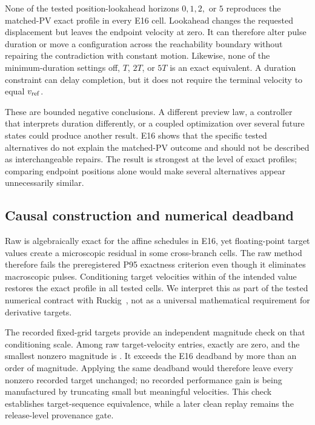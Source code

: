 None of the tested position-lookahead horizons $0,1,2,$ or $5$ reproduces the matched-PV exact profile in every E16 cell. Lookahead changes the requested displacement but leaves the endpoint velocity at zero. It can therefore alter pulse duration or move a configuration across the reachability boundary without repairing the contradiction with constant motion. Likewise, none of the minimum-duration settings off, $T$, $2T$, or $5T$ is an exact equivalent. A duration constraint can delay completion, but it does not require the terminal velocity to equal $v_{\mathrm{ref}}$.

These are bounded negative conclusions. A different preview law, a controller that interprets duration differently, or a coupled optimization over several future states could produce another result. E16 shows that the specific tested alternatives do not explain the matched-PV outcome and should not be described as interchangeable repairs. The result is strongest at the level of exact profiles; comparing endpoint positions alone would make several alternatives appear unnecessarily similar.



\subsection{Causal construction and numerical deadband}

Raw \FutureOOne{} is algebraically exact for the affine schedules in E16, yet floating-point target values create a microscopic residual in some cross-branch cells. The raw method therefore fails the preregistered P95 exactness criterion even though it eliminates macroscopic pulses. Conditioning target velocities within \RecordedDeadband{} of the intended value restores the exact profile in all tested cells. We interpret this as part of the tested numerical contract with Ruckig~\RuckigVersion, not as a universal mathematical requirement for derivative targets.

The recorded fixed-grid targets provide an independent magnitude check on that conditioning scale. Among \RecordedCycleCount{} raw target-velocity entries, exactly \RecordedZeroTargetCount{} are zero, and the smallest nonzero magnitude is \RecordedMinimumNonzeroTarget. It exceeds the E16 deadband by more than an order of magnitude. Applying the same deadband would therefore leave every nonzero recorded target unchanged; no recorded performance gain is being manufactured by truncating small but meaningful velocities. This check establishes target-sequence equivalence, while a later clean replay remains the release-level provenance gate.

